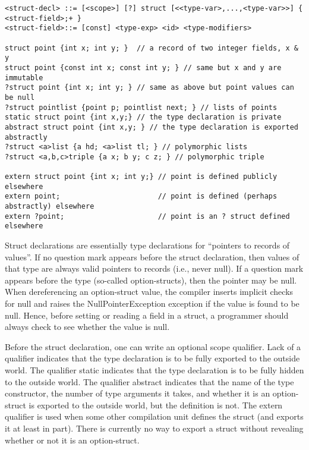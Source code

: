 \documentclass[titlepage,10pt]{article}
\begin{document}
\begin{verbatim}
<struct-decl> ::= [<scope>] [?] struct [<<type-var>,...,<type-var>>] { <struct-field>;+ }
<struct-field>::= [const] <type-exp> <id> <type-modifiers>

struct point {int x; int y; }  // a record of two integer fields, x & y
struct point {const int x; const int y; } // same but x and y are immutable 
?struct point {int x; int y; } // same as above but point values can be null
?struct pointlist {point p; pointlist next; } // lists of points
static struct point {int x,y;} // the type declaration is private
abstract struct point {int x,y; } // the type declaration is exported abstractly
?struct <a>list {a hd; <a>list tl; } // polymorphic lists
?struct <a,b,c>triple {a x; b y; c z; } // polymorphic triple

extern struct point {int x; int y;} // point is defined publicly elsewhere
extern point;                       // point is defined (perhaps abstractly) elsewhere
extern ?point;                      // point is an ? struct defined elsewhere
\end{verbatim}

Struct declarations are essentially type declarations for ``pointers to
records of values''.  If no question mark appears before the struct
declaration, then values of that type are always valid pointers to
records (i.e., never null).  If a question mark appears before the type
(so-called option-structs), then the pointer may be null.  When
dereferencing an option-struct value, the compiler inserts implicit
checks for null and raises the NullPointerException exception if the
value is found to be null.  Hence, before setting or reading a field in
a struct, a programmer should always check to see whether the value is
null.

Before the struct declaration, one can write an optional scope
qualifier.  Lack of a qualifier indicates that the type declaration is
to be fully exported to the outside world.  The qualifier static
indicates that the type declaration is to be fully hidden to the outside
world.  The qualifier abstract indicates that the name of the type
constructor, the number of type arguments it takes, and whether it is an
option-struct  is exported to the outside world, but the definition is
not.  The extern qualifier is used when some other compilation unit
defines the struct (and exports it at least in part).  There is
currently no way to export a struct without revealing whether or not it
is an option-struct.
\end{document}
